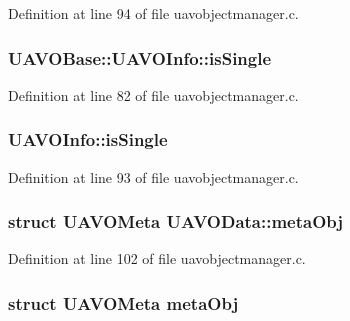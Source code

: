 Definition at line 94 of file uavobjectmanager.\-c.

\hypertarget{group___u_a_v_ga2ac5c0e20d294c304f14e18fd2fdc61a}{
\subsubsection[{is\-Single}]{ U\-A\-V\-O\-Base\-::\-U\-A\-V\-O\-Info\-::is\-Single}}\label{group___u_a_v_ga2ac5c0e20d294c304f14e18fd2fdc61a}


Definition at line 82 of file uavobjectmanager.\-c.

\hypertarget{group___u_a_v_gac17e3b9e0eaf982bbbba5545026f7bb4}{
\subsubsection[{is\-Single}]{ U\-A\-V\-O\-Info\-::is\-Single}}\label{group___u_a_v_gac17e3b9e0eaf982bbbba5545026f7bb4}


Definition at line 93 of file uavobjectmanager.\-c.

\hypertarget{group___u_a_v_ga81dba5fc31f263dc85688f290703f9c5}{
\subsubsection[{meta\-Obj}]{\setlength{\rightskip}{0pt plus 5cm}struct {\bf U\-A\-V\-O\-Meta} U\-A\-V\-O\-Data\-::meta\-Obj}}\label{group___u_a_v_ga81dba5fc31f263dc85688f290703f9c5}


Definition at line 102 of file uavobjectmanager.\-c.

\hypertarget{group___u_a_v_ga901520d72fd09e2e09ca22e17fd95b63}{
\subsubsection[{meta\-Obj}]{\setlength{\rightskip}{0pt plus 5cm}struct {\bf U\-A\-V\-O\-Meta} meta\-Obj}}\label{group___u_a_v_ga901520d72fd09e2e09ca22e17fd95b63}


